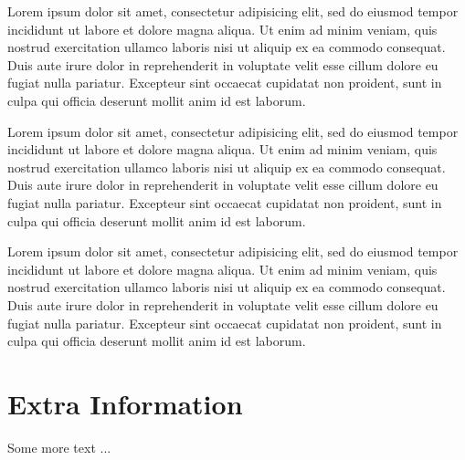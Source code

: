 \documentclass[withindex,glossary]{cam-thesis}
\begin{document}
Lorem ipsum dolor sit amet, consectetur adipisicing elit, sed do eiusmod tempor incididunt ut labore et dolore magna aliqua. Ut enim ad minim veniam, quis nostrud exercitation ullamco laboris nisi ut aliquip ex ea commodo consequat. Duis aute irure dolor in reprehenderit in voluptate velit esse cillum dolore eu fugiat nulla pariatur. Excepteur sint occaecat cupidatat non proident, sunt in culpa qui officia deserunt mollit anim id est laborum.

Lorem ipsum dolor sit amet, consectetur adipisicing elit, sed do eiusmod tempor incididunt ut labore et dolore magna aliqua. Ut enim ad minim veniam, quis nostrud exercitation ullamco laboris nisi ut aliquip ex ea commodo consequat. Duis aute irure dolor in reprehenderit in voluptate velit esse cillum dolore eu fugiat nulla pariatur. Excepteur sint occaecat cupidatat non proident, sunt in culpa qui officia deserunt mollit anim id est laborum.

Lorem ipsum dolor sit amet, consectetur adipisicing elit, sed do eiusmod tempor incididunt ut labore et dolore magna aliqua. Ut enim ad minim veniam, quis nostrud exercitation ullamco laboris nisi ut aliquip ex ea commodo consequat. Duis aute irure dolor in reprehenderit in voluptate velit esse cillum dolore eu fugiat nulla pariatur. Excepteur sint occaecat cupidatat non proident, sunt in culpa qui officia deserunt mollit anim id est laborum.



%

\renewcommand{\bibname}{References}
\cleardoublepage
{}
{}






\appendix

\chapter{Extra Information}
Some more text ...



\printthesisindex
\end{document}
